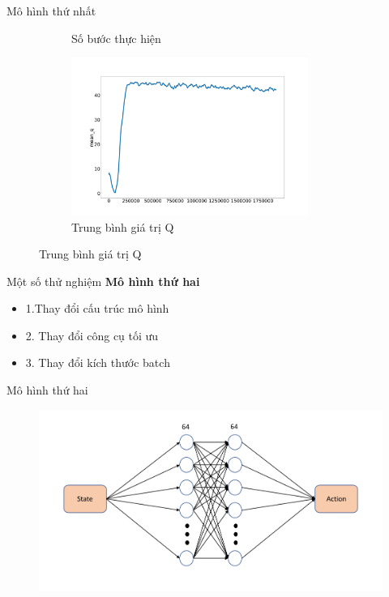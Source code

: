 \documentclass{beamer}
\begin{document}
\begin{frame}{Mô hình thứ nhất}
\begin{figure}[ht]
\begin{subfigure}{.5\textwidth}
    		\caption{Số bước thực hiện}
    		\label{fig:baseline_step}
    	\end{subfigure}%
    	\begin{subfigure}{.5\textwidth}
    		\includegraphics[width=0.85\textwidth]{Pic/First_model_50_reward/mean_q.png}
    		\caption{Trung bình giá trị Q}
    		\label{fig:baseline_mean_q}
    	\end{subfigure}
    	\label{fig:result_baseline}
    \end{figure}
\end{frame}
\begin{frame}{Một số thử nghiệm}
    \textbf{Mô hình thứ hai}
    \vspace{0.5cm}
    \begin{itemize}
        \item 1.Thay đổi cấu trúc mô hình
        \vspace{0.5cm}
        \item 2. Thay đổi công cụ tối ưu
        \vspace{.5cm}
        \item 3. Thay đổi kích thước batch
    \end{itemize}
\end{frame}
\begin{frame}{Mô hình thứ hai}
	\begin{figure}
		\centering
		\includegraphics[width=\linewidth]{Pic/Second_model/second_arch.pdf}
	\end{figure}
\end{frame}
\end{document}
